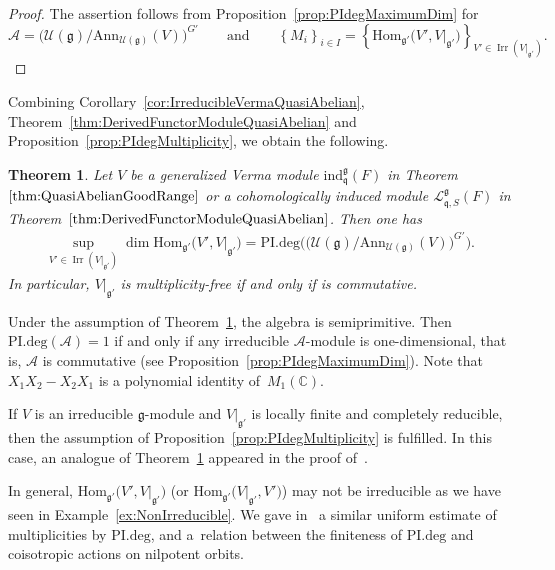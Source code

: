 \documentclass[10pt,a4paper]{amsart}
\numberwithin{equation}{section}
\newtheorem{Theorem}{Theorem}[section]
\theoremstyle{definition}
\newcommand{\set}[1]{\left\{#1 \right\}}
\newcommand{\Hom}{\mathrm{Hom}}
\newcommand{\BasicRing}[1]{\mathbb{#1}}
\newcommand{\CC}{\BasicRing{C}}
\newcommand{\Ann}{\mathrm{Ann}}
\newcommand{\PIdeg}{\mathrm{PI.deg}}
\newcommand{\alg}[1]{\mathcal{#1}}
\newcommand{\lieC}[1]{\mathfrak{#1}}
\newcommand{\lie}[1]{\mathfrak{#1}}
\newcommand{\univ}[1]{\mathcal{U}(\lieC{#1})}
\newcommand{\ind}[2]{\mathrm{ind}^{\lieC{#1}}_{\lieC{#2}}}
\DeclareMathOperator{\Irr}{\mathrm{Irr}}
\newcommand{\lmod}[3]{\mathcal{L}^{\lie{#1}}_{\lie{#2}, #3}}
\begin{document}
\begin{proof}
	The assertion follows from Proposition~\ref{prop:PIdegMaximumDim} for
\[
\alg{A} = \bigl(\univ{g}/\Ann_{\univ{g}}(V)\bigr)^{G'}
	\qquad\text{and}\qquad
\set{M_i}_{i \in I} = \set{\Hom_{\lie{g'}}\bigl(V', V|_{\lie{g'}}\bigr)}_{V' \in \Irr(V|_{\lie{g'}})}.
\tag*{\qed}
\]
\renewcommand{\qed}{}
\end{proof}

Combining Corollary~\ref{cor:IrreducibleVermaQuasiAbelian}, Theorem~\ref{thm:DerivedFunctorModuleQuasiAbelian} and Proposition~\ref{prop:PIdegMultiplicity}, we obtain the following.

\begin{Theorem}\label{thm:PIdegMultiplicity}
	Let $V$ be a generalized Verma module $\ind{g}{q}(F)$ in Theorem~$\ref{thm:QuasiAbelianGoodRange}$ or a cohomologically induced module $\lmod{g}{q}{S}(F)$ in Theorem~$\ref{thm:DerivedFunctorModuleQuasiAbelian}$.
	Then one has
	\begin{align*}
		\sup_{V' \in \Irr(V|_{\lie{g'}})} \dim \Hom_{\lie{g'}}\bigl(V', V|_{\lie{g'}}\bigr) = \PIdeg\bigl(\bigl(\univ{g}/\Ann_{\univ{g}}(V)\bigr)^{G'}\bigr).
	\end{align*}
	In particular, $V|_{\lie{g'}}$ is multiplicity-free if and only if \smash{$\bigl(\univ{g}/\Ann_{\univ{g}}(V)\bigr)^{G'}$} is commutative.
\end{Theorem}

Under the assumption of Theorem~\ref{thm:PIdegMultiplicity}, the algebra \smash{$\alg{A}\coloneq \bigl(\univ{g}/\Ann_{\univ{g}}(V)\bigr)^{G'}$} is semiprimitive.
Then $\PIdeg(\alg{A}) = 1$ if and only if any irreducible $\alg{A}$-module is one-dimensional, that is, $\alg{A}$ is commutative (see Proposition~\ref{prop:PIdegMaximumDim}).
Note that $X_1X_2 - X_2X_1$ is a polynomial identity of~$M_1(\CC)$.

If $V$ is an irreducible $\lie{g}$-module and $V|_{\lie{g'}}$ is locally finite and completely reducible,
then the assumption of Proposition~\ref{prop:PIdegMultiplicity} is fulfilled.
In this case, an analogue of Theorem~\ref{thm:PIdegMultiplicity} appeared in the proof of~\cite[Theorem~4.3]{PeSe12}.

In general, $\Hom_{\lie{g'}}\bigl(V', V|_{\lie{g'}}\bigr)$ \big(or $\Hom_{\lie{g'}}\bigl(V|_{\lie{g'}}, V'\bigr)$\big) may not be irreducible as we have seen in Example~\ref{ex:NonIrreducible}.
We gave in~\cite{Ki20} a similar uniform estimate of multiplicities by $\PIdeg$,
and a~relation between the finiteness of $\PIdeg$ and coisotropic actions on nilpotent orbits.
\end{document}
